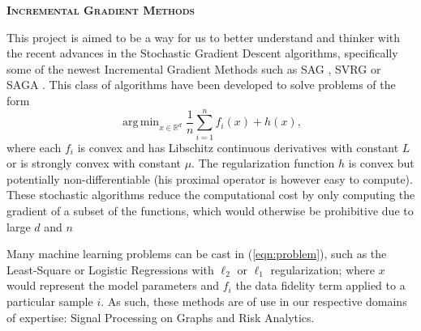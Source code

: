 \documentclass[a4paper,11pt]{article}
\DeclareMathOperator*{\argmin}{arg\,min}
\newcommand{\R}{\mathbb{R}}
\newcommand{\eqnref}[1]{(\ref{eqn:#1})}
\begin{document}
\begin{center} 
	\Large{\textbf{\textsc{Incremental Gradient Methods}}}
\end{center}


This project is aimed to be a way for us to better understand and thinker with
the recent advances in the Stochastic Gradient Descent algorithms, specifically
some of the newest Incremental Gradient Methods such as SAG
\cite{schmidt_minimizing_2013}, SVRG \cite{johnson_accelerating_2013} or SAGA
\cite{defazio_saga_2014}. This class of algorithms have been developed to solve
problems of the form
\begin{equation} \label{eqn:problem}
	\argmin_{x \in \R^d} \frac{1}{n} \sum_{i=1}^n f_i(x) + h(x),
\end{equation}
where each $f_i$ is convex and has Libschitz continuous derivatives with
constant $L$ or is strongly convex with constant $\mu$. The regularization
function $h$ is convex but potentially non-differentiable (his proximal operator
is however easy to compute). These stochastic algorithms reduce the
computational cost by only computing the gradient of a subset of the functions,
which would otherwise be prohibitive due to large $d$ and $n$

Many machine learning problems can be cast in \eqnref{problem}, such as the
Least-Square or Logistic Regressions with $\ell_2$ or $\ell_1$ regularization;
where $x$ would represent the model parameters and $f_i$ the data fidelity term
applied to a particular sample $i$. As such, these methods are of use in our
respective domains of expertise: Signal Processing on Graphs and Risk Analytics.
\end{document}
